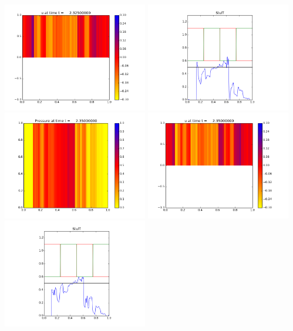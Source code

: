\documentclass[11pt]{article}
\begin{document}
\includegraphics[width=0.475\textwidth]{frame0093fig1.png}
\vskip 10pt 
\includegraphics[width=0.475\textwidth]{frame0093fig3.png}
\vskip 10pt 
\includegraphics[width=0.475\textwidth]{frame0094fig0.png}
\includegraphics[width=0.475\textwidth]{frame0094fig1.png}
\vskip 10pt 
\includegraphics[width=0.475\textwidth]{frame0094fig3.png}
\end{document}
